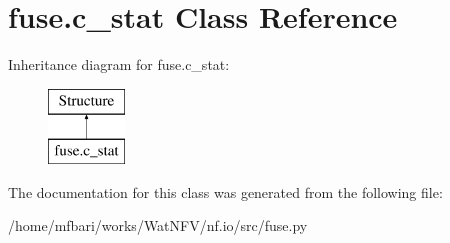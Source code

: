 \hypertarget{classfuse_1_1c__stat}{\section{fuse.\-c\-\_\-stat Class Reference}
\label{classfuse_1_1c__stat}
}
Inheritance diagram for fuse.\-c\-\_\-stat\-:\begin{figure}[H]
\begin{center}
\leavevmode
\includegraphics[height=2.000000cm]{classfuse_1_1c__stat}
\end{center}
\end{figure}


The documentation for this class was generated from the following file\-:\begin{DoxyCompactItemize}
\item 
/home/mfbari/works/\-Wat\-N\-F\-V/nf.\-io/src/fuse.\-py\end{DoxyCompactItemize}
